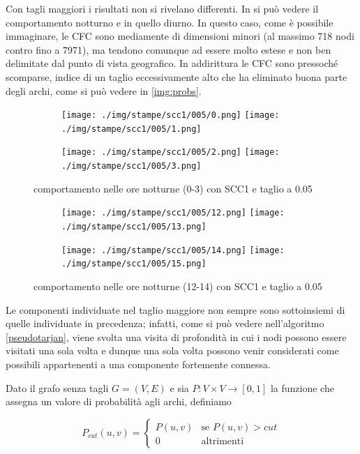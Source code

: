 \documentclass[10pt,a4paper]{article}
\begin{document}
Con tagli maggiori i risultati non si rivelano differenti. In \label{scc1_0-05_night} si può vedere il comportamento notturno e in \label{scc1_0-05_day} quello diurno. In questo caso, come è possibile immaginare, le CFC sono mediamente di dimensioni minori (al massimo 718 nodi contro fino a 7971), ma tendono comunque ad essere molto estese e non ben delimitate dal punto di vista geografico. In \label{scc1_0-05_day} addirittura le CFC sono pressoché scomparse, indice di un taglio eccessivamente alto che ha eliminato buona parte degli archi, come si può vedere in \ref{img:probs}.
\begin{figure}
\centering
\begin{subfigure}[b]{1\textwidth}
\texttt{[image: ./img/stampe/scc1/005/0.png]}
\texttt{[image: ./img/stampe/scc1/005/1.png]}
\end{subfigure}
\begin{subfigure}[b]{1\textwidth}
\texttt{[image: ./img/stampe/scc1/005/2.png]}
\texttt{[image: ./img/stampe/scc1/005/3.png]}
\end{subfigure}
\caption{comportamento nelle ore notturne (0-3) con SCC1 e taglio a 0.05}
\label{scc1_0-05_night}
\end{figure}
\begin{figure}
\centering
\begin{subfigure}[b]{1\textwidth}
\texttt{[image: ./img/stampe/scc1/005/12.png]}
\texttt{[image: ./img/stampe/scc1/005/13.png]}
\end{subfigure}
\begin{subfigure}[b]{1\textwidth}
\texttt{[image: ./img/stampe/scc1/005/14.png]}
\texttt{[image: ./img/stampe/scc1/005/15.png]}
\end{subfigure}
\caption{comportamento nelle ore notturne (12-14) con SCC1 e taglio a 0.05}
\label{scc1_0-05_day}
\end{figure}
Le componenti individuate nel taglio maggiore non sempre sono sottoinsiemi di quelle individuate in precedenza; infatti, come si può vedere nell'algoritmo \ref{pseudotarjan}, viene svolta una visita di profondità in cui i nodi possono essere visitati una sola volta e dunque una sola volta possono venir considerati come possibili appartenenti a una componente fortemente connessa. 

Dato il grafo senza tagli $G=(V,E)$ e sia $P:V \times V \to [0,1]$ la funzione che assegna un valore di probabilità agli archi, definiamo

$$P_{cut}(u,v) =
\begin{cases}
P(u,v) & \text{se } P(u,v) > cut\\
0 	& \text{altrimenti}
\end{cases}$$
\end{document}
